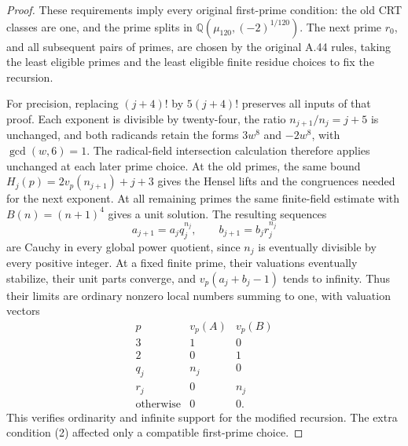\begin{proof}
These requirements imply every original first-prime
condition: the old CRT classes are one, and the prime
splits in \(\mathbb Q(\mu_{120},(-2)^{1/120})\).
The next prime \(r_0\), and all subsequent pairs of
primes, are chosen by the original A.44 rules, taking
the least eligible primes and the least eligible finite
residue choices to fix the recursion.

For precision, replacing \((j+4)!\) by \(5(j+4)!\)
preserves all inputs of that proof. Each exponent is
divisible by twenty-four, the ratio
\(n_{j+1}/n_j=j+5\) is unchanged, and both radicands
retain the forms \(3w^8\) and \(-2w^8\), with
\(\gcd(w,6)=1\). The radical-field intersection
calculation therefore applies unchanged at each later
prime choice. At the old primes, the same bound
\(H_j(p)=2v_p(n_{j+1})+j+3\) gives the Hensel lifts
and the congruences needed for the next exponent.
At all remaining primes the same finite-field estimate
with \(B(n)=(n+1)^4\) gives a unit solution.
The resulting sequences
\[
 a_{j+1}=a_jq_j^{n_j},\qquad
 b_{j+1}=b_jr_j^{n_j}
\]
are Cauchy in every global power quotient, since
\(n_j\) is eventually divisible by every positive
integer. At a fixed finite prime, their valuations
eventually stabilize, their unit parts converge, and
\(v_p(a_j+b_j-1)\) tends to infinity. Thus their
limits are ordinary nonzero local numbers summing
to one, with valuation vectors
\[
 \begin{array}{c|cc}
  p&v_p(A)&v_p(B)\\\hline
  3&1&0\\
  2&0&1\\
  q_j&n_j&0\\
  r_j&0&n_j\\
  \text{otherwise}&0&0.
 \end{array}
\]
This verifies ordinarity and infinite support for the
modified recursion. The extra condition (2) affected
only a compatible first-prime choice.


\end{proof}
